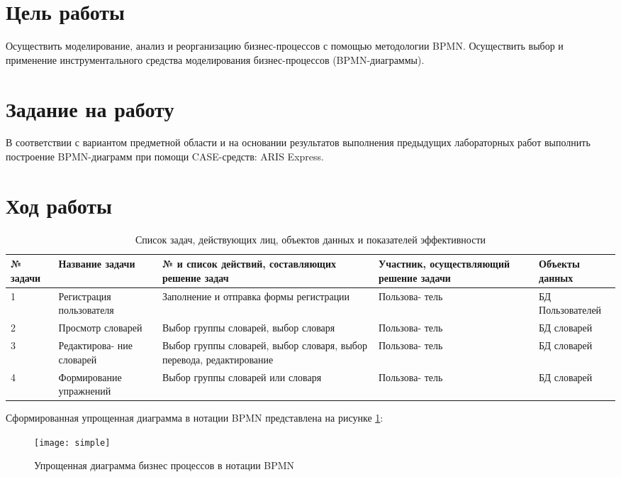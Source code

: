 \documentclass[a4paper,14pt]{extarticle}
\begin{document}


\section{Цель работы}
Осуществить моделирование, анализ и реорганизацию бизнес-процессов с помощью
методологии BPMN. Осуществить выбор и применение инструментального средства
моделирования бизнес-процессов (BPMN-диаграммы).

\section{Задание на работу}
В соответствии с вариантом предметной области и на основании результатов
выполнения предыдущих лабораторных работ выполнить построение BPMN-диаграмм при
помощи CASE-средств: ARIS Express.

\section{Ход работы}
\begin{table}[H]
    \caption{Список задач, действующих лиц, объектов данных и показателей эффективности}
    \begin{tabular}{| p{2cm} | p{3cm} | p{5cm} | p{2.5cm} | p{2.5cm} |}
        \hline
        № задачи & Название задачи & № и список действий, составляющих решение задач & Участник, осуществляющий решение задачи & Объекты данных \\ \hline
        1 & Регистрация пользователя & Заполнение и отправка формы регистрации & Пользова- тель & БД Пользователей \\ \hline
        2 & Просмотр словарей & Выбор группы словарей, выбор словаря & Пользова- тель & БД словарей \\ \hline
        3 & Редактирова- ние словарей & Выбор группы словарей, выбор словаря, выбор перевода, редактирование & Пользова- тель & БД словарей \\\hline
        4 & Формирование упражнений & Выбор группы словарей или словаря & Пользова- тель & БД словарей \\ \hline
    \end{tabular}
\end{table}

Сформированная упрощенная диаграмма в нотации BPMN представлена на рисунке \ref{fig:simple}:
\begin{figure}[H]
    \centering
    \texttt{[image: simple]}
    \caption{Упрощенная диаграмма бизнес процессов в нотации BPMN}
    \label{fig:simple}
\end{figure}
\end{document}
